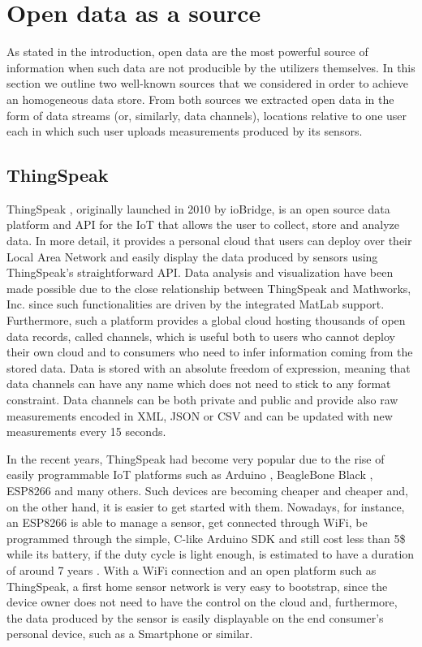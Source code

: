 \section{Open data as a source}
\label{sec:open}

As stated in the introduction, open data are the most powerful source of information when such data are not producible by the utilizers themselves.
In this section we outline two well-known sources that we considered in order to achieve an homogeneous data store.
From both sources we extracted open data in the form of data streams (or, similarly, data channels), locations relative to one user each in which such user uploads measurements produced by its sensors.

\subsection{ThingSpeak}
ThingSpeak \cite{thingspeak}, originally launched in 2010 by ioBridge, is an open source data platform and API for the IoT that allows the user to collect, store and analyze data.
In more detail, it provides a personal cloud that users can deploy over their Local Area Network and easily display the data produced by sensors using ThingSpeak's straightforward API.
Data analysis and visualization have been made possible due to the close relationship between ThingSpeak and Mathworks, Inc. since such functionalities are driven by the integrated MatLab support. 
Furthermore, such a platform provides a global cloud hosting thousands of open data records, called channels, which is useful both to users who cannot deploy their own cloud and to consumers who need to infer information coming from the stored data.
Data is stored with an absolute freedom of expression, meaning that data channels can have any name which does not need to stick to any format constraint.
Data channels can be both private and public and provide also raw measurements encoded in XML, JSON or CSV and can be updated with new measurements every 15 seconds.

In the recent years, ThingSpeak had become very popular due to the rise of easily programmable IoT platforms such as Arduino \cite{arduino}, BeagleBone Black \cite{bbblack}, ESP8266 \cite{esp8266} and many others.
Such devices are becoming cheaper and cheaper and, on the other hand, it is easier to get started with them.
Nowadays, for instance, an ESP8266 is able to manage a sensor, get connected through WiFi, be programmed through the simple, C-like Arduino SDK and still cost less than 5\$ while its battery, if the duty cycle is light enough, is estimated to have a duration of around 7 years \cite{di2015design}.
With a WiFi connection and an open platform such as ThingSpeak, a first home sensor network is very easy to bootstrap, since the device owner does not need to have the control on the cloud and, furthermore, the data produced by the sensor is easily displayable on the end consumer's personal device, such as a Smartphone or similar.

